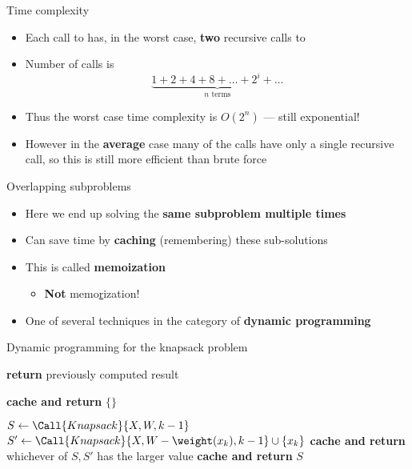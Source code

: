 \begin{frame}{Time complexity}
	\begin{itemize}
		\pause\item Each call to  has, in the worst case, \textbf{two} recursive calls to 
		\pause\item Number of calls is
			$$ \underbrace{1 + 2 + 4 + 8 + \dots + 2^i + \dots}_{\text{$n$ terms}} $$
		\pause\item Thus the worst case time complexity is $O(2^n)$ --- still exponential!
		\pause\item However in the \textbf{average} case many of the calls have only a single recursive call,
			so this is still more efficient than brute force
	\end{itemize}
\end{frame}

\begin{frame}{Overlapping subproblems}
	\begin{itemize}
		\pause\item Here we end up solving the \textbf{same subproblem multiple times}
		\pause\item Can save time by \textbf{caching} (remembering) these sub-solutions
		\pause\item This is called \textbf{memoization}
			\begin{itemize}
				\pause\item \textbf{Not} memo\underline{r}ization!
			\end{itemize}
		\pause\item One of several techniques in the category of \textbf{dynamic programming}
	\end{itemize}
\end{frame}

\begin{frame}{Dynamic programming for the knapsack problem}
    {\small
	\begin{algorithmic}
		\pause{}
			\pause{}
				\pause\State \textbf{return} previously computed result
			\pause\EndIf
			
			\pause{}
				\State \textbf{cache and return} $\{\}$
			\EndIf
			
			\State $S \gets \Call{Knapsack}{X, W, k-1}$
				\State $S' \gets \Call{Knapsack}{X, W - \weight(x_k), k-1} \cup \{x_k\}$
				\State \textbf{cache and return} whichever of $S,S'$ has the larger value
			\Else
				\State \textbf{cache and return} $S$
			\EndIf
		\EndProcedure
	\end{algorithmic}
	}
\end{frame}

